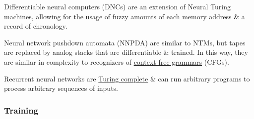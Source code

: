 \documentclass{article}
\begin{document}
\begin{itemize}
	Differentiable neural computers (DNCs) are an extension of Neural Turing machines, allowing for the usage of fuzzy amounts of each memory address \& a record of chronology.
	
	Neural network pushdown automata (NNPDA) are similar to NTMs, but tapes are replaced by analog stacks that are differentiable \& trained. In this way, they are similar in complexity to recognizers of \href{https://en.wikipedia.org/wiki/Context_free_grammar}{context free grammars} (CFGs).
	
	Recurrent neural networks are \href{https://en.wikipedia.org/wiki/Turing_complete}{Turing complete} \& can run arbitrary programs to process arbitrary sequences of inputs.
\end{itemize}

\subsubsection{Training}
\end{document}
